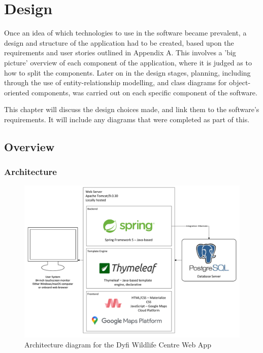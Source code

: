 \chapter{Design}

Once an idea of which technologies to use in the software became prevalent, a design and structure of the application had to be created, based upon the requirements and user stories outlined in Appendix A. This involves a 'big picture' overview of each component of the application, where it is judged as to how to split the components. Later on in the design stages, planning, including through the use of entity-relationship modelling, and class diagrams for object-oriented components, was carried out on each specific component of the software.

This chapter will discuss the design choices made, and link them to the software's requirements. It will include any diagrams that were completed as part of this.
\newpage
\section{Overview}

\subsection{Architecture}
\begin{figure}[!ht]
	\caption{Architecture diagram for the Dyfi Wildlife Centre Web App}
	\includegraphics[scale=0.5]{diagrams/architecture_diagram}
\end{figure}	

